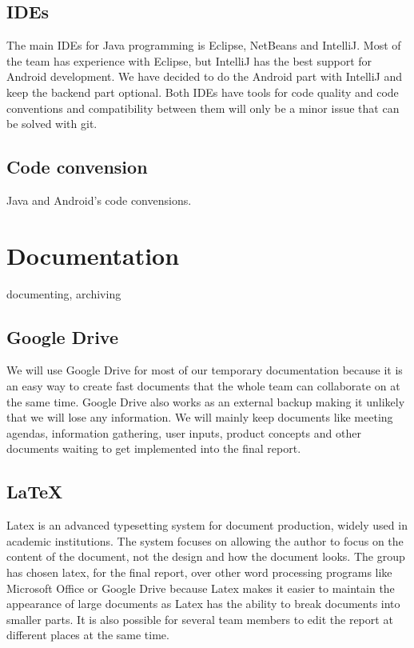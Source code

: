 \subsection{IDEs}
The main IDEs for Java programming is Eclipse, NetBeans and IntelliJ. Most of the team has experience with Eclipse, but IntelliJ has the best support for Android development.
We have decided to do the Android part with IntelliJ and keep the backend part optional. Both IDEs have tools for code quality and code conventions and compatibility between them will only be a minor issue that can be solved with git.

\subsection{Code convension}
Java and Android's code convensions.

\section{Documentation}
documenting, archiving


\subsection{Google Drive}
We will use Google Drive for most of our temporary documentation because it is an easy way to create fast documents that the whole team can collaborate on at the same time. Google Drive also works as an external backup making it unlikely that we will lose any information. We will mainly keep documents like meeting agendas, information gathering, user inputs, product concepts and other documents waiting to get implemented into the final report.

\subsection{LaTeX}
Latex is an advanced typesetting system for document production, widely used in
academic institutions. The system focuses on allowing the author to focus on the content of the document, not the design and how the document looks.
The group has chosen latex, for the final report, over other word processing programs like Microsoft Office or Google Drive because Latex makes it easier to maintain the appearance of large documents as Latex has the ability to break documents into smaller parts. It is also possible for several team members to edit the report at different places at the same time.


